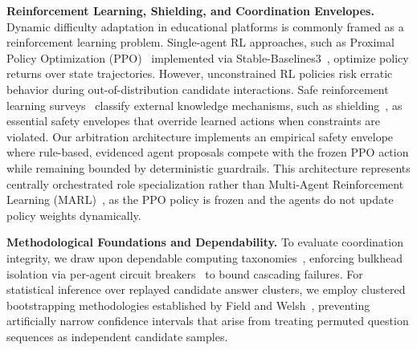 \noindent\textbf{Reinforcement Learning, Shielding, and Coordination Envelopes.} Dynamic difficulty adaptation in educational platforms is commonly framed as a reinforcement learning problem. Single-agent RL approaches, such as Proximal Policy Optimization (PPO)~\cite{ppo} implemented via Stable-Baselines3~\cite{sb3}, optimize policy returns over state trajectories. However, unconstrained RL policies risk erratic behavior during out-of-distribution candidate interactions. Safe reinforcement learning surveys~\cite{safe} classify external knowledge mechanisms, such as shielding~\cite{shield}, as essential safety envelopes that override learned actions when constraints are violated. Our arbitration architecture implements an empirical safety envelope where rule-based, evidenced agent proposals compete with the frozen PPO action while remaining bounded by deterministic guardrails. This architecture represents centrally orchestrated role specialization rather than Multi-Agent Reinforcement Learning (MARL)~\cite{marl}, as the PPO policy is frozen and the agents do not update policy weights dynamically.

\noindent\textbf{Methodological Foundations and Dependability.} To evaluate coordination integrity, we draw upon dependable computing taxonomies~\cite{alrl04}, enforcing bulkhead isolation via per-agent circuit breakers~\cite{nygard} to bound cascading failures. For statistical inference over replayed candidate answer clusters, we employ clustered bootstrapping methodologies established by Field and Welsh~\cite{fw07}, preventing artificially narrow confidence intervals that arise from treating permuted question sequences as independent candidate samples.
